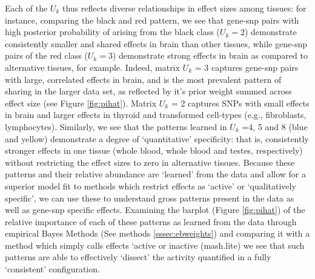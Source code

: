 Each of the $U_{k}$ thus reflects diverse relationships in effect sizes among tissues: for instance, comparing the black and red pattern, we see that gene-snp pairs with high posterior probability of arising from the black class ($U_{k}=2$) demonstrate consistently smaller and shared effects in brain than other tissues, while gene-snp pairs of the red class ($U_{k}=3$) demonstrate strong effects in brain as compared to alternative tissues, for example. Indeed, matrix $U_{k}$ = 3 captures gene-snp pairs with large, correlated effects in brain, and is the most prevalent pattern of sharing in the larger data set, as reflected by it's prior weight summed across effect size (see Figure \ref{fig:pihat}). Matrix $U_{k}$ = 2 captures SNPs with small effects in brain and larger effects in thyroid and transformed cell-types (e.g., fibroblasts, lymphocytes).
Similarly, we see that the patterns learned in $U_{k}$ =4, 5 and 8 (blue and yellow) demonstrate a degree of `quantitative' specificity: that is, consistently stronger effects in one tissue (whole blood, whole blood and testes, respectively) without restricting the effect sizes to zero in alternative tissues. Because these patterns and their relative abundance are `learned' from the data and allow for a superior model fit to methods which restrict effects as `active' or `qualitatively specific', we can use these to understand gross patterns present in the data as well as gene-snp specific effects. Examining the barplot (Figure \ref{fig:pihat}) of the relative importance of each of these patterns as learned from the data through empirical Bayes Methods (See methods \ref{sssec:ebweights}) and comparing it with a method which simply calls effects `active or inactive (mash.lite) we see that such patterns are able to effectively `dissect' the activity quantified in a fully `consistent' configuration.

%



